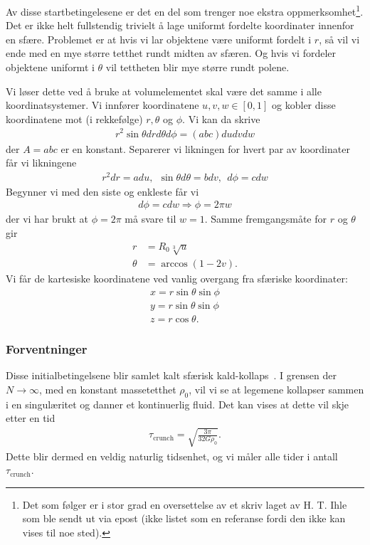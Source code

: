 \documentclass[11pt]{article}
\begin{document}
\begin{multicols}{2}
Av disse startbetingelesene er det en del som trenger noe ekstra
oppmerksomhet\footnote{Det som følger er i stor grad en oversettelse
  av et skriv laget av H. T. Ihle som ble sendt ut via epost (ikke
  listet som en referanse fordi den ikke kan vises til noe sted).}. Det er ikke helt fullstendig trivielt å lage uniformt
fordelte koordinater innenfor en sfære. Problemet er at hvis vi lar
objektene være uniformt fordelt i $r$, så vil vi ende med en mye
større tetthet rundt midten av sfæren. Og hvis vi fordeler objektene
uniformt i $\theta$ vil tettheten blir mye større rundt polene. 

Vi løser dette ved å bruke at volumelementet skal være det samme i
alle koordinatsystemer. Vi innfører koordinatene $u, v, w \in [0,1]$
og kobler disse koordinatene mot (i rekkefølge) $r,\theta$ og
$\phi$. Vi kan da skrive 
\begin{align*}
  r^2\sin\theta dr d\theta d\phi = (abc)dudvdw
\end{align*}
der $A=abc$ er en konstant. Separerer vi likningen for hvert par av
koordinater får vi likningene 
\begin{align*}
  r^2dr = adu,\ \ \sin\theta d\theta = bdv,\ \ d\phi = cdw
\end{align*}
Begynner vi med den siste og enkleste får vi 
\begin{align}
  d\phi = cdw\Rightarrow \phi = 2\pi w
\end{align}
der vi har brukt at $\phi=2\pi$ må svare til $w=1$. Samme
fremgangsmåte for $r$ og $\theta$ gir
\begin{align}
  r &= R_0 \sqrt[3]{u}\\
  \theta &= \arccos(1-2v).
\end{align}
Vi får de kartesiske koordinatene ved vanlig overgang fra sfæriske
koordinater:
\begin{align*}
  x = r\sin\theta\sin\phi\\
y = r\sin\theta\sin\phi\\
z = r\cos\theta.
\end{align*}


\subsubsection{Forventninger}
Disse initialbetingelsene blir samlet kalt sfærisk
kald-kollaps~\cite{cold-collapse}. I grensen der $N\rightarrow\infty$,
med en konstant massetetthet $\rho_0$, vil vi se at legemene kollapser
sammen i en singulæritet og danner et kontinuerlig fluid. Det kan
vises at dette vil skje etter en tid~\cite{project5-exercise}
\begin{align}
  \tau_\text{crunch} = \sqrt{\frac{ 3\pi }{ 32G\rho_0 }}\label{eq:t-crunch}.
\end{align}
Dette blir dermed en veldig naturlig tidsenhet, og vi måler alle tider
i antall $\tau_\text{crunch}$. 


\end{multicols}
\end{document}
